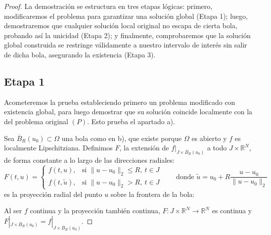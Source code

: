 \begin{proof}
    La demostración se estructura en tres etapas lógicas: primero, modificaremos el problema para garantizar una solución global (Etapa 1); luego, demostraremos que cualquier solución local original no escapa de cierta bola, probando así la unicidad (Etapa 2); y finalmente, comprobaremos que la solución global construida se restringe válidamente a nuestro intervalo de interés sin salir de dicha bola, asegurando la existencia (Etapa 3).

    \subsection*{Etapa 1}
    Acometeremos la prueba estableciendo primero un problema modificado con existencia global, para luego demostrar que su solución coincide localmente con la del problema original $(P)$. Esto prueba el apartado a).

    Sea $\overline{B}_R(u_0) \subset \Omega$ una bola como en b), que existe porque $\Omega$ es abierto y $f$ es localmente Lipschitziana. Definimos $F$, la extensión de $f|_{J \times \overline{B}_R(u_0)}$ a todo $J \times \mathbb{R}^N$, de forma constante a lo largo de las direcciones radiales:
    \[
        F(t,u) = \begin{cases}
            f(t,u), & \text{si } \| u - u_0 \|_2 \leq R, \ t \in J \\
            f(t, \tilde{u}), & \text{si } \| u - u_0 \|_2 > R, \ t \in J
        \end{cases}
        \qquad \text{donde } \tilde{u} = u_0 + R \frac{u - u_0}{\| u - u_0 \|_2}
    \]
    es la proyección radial del punto $u$ sobre la frontera de la bola:
    \begin{center}
    \end{center}
    Al ser $f$ continua y la proyección también continua, $F : J \times \mathbb{R}^N \to \mathbb{R}^N$ es continua y $F|_{J \times \overline{B}_R(u_0)} = f|_{J \times \overline{B}_R(u_0)}$.


\end{proof}
